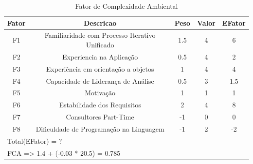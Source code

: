 \begin{table}[!htb]
\caption[FCA]{Fator de Complexidade Ambiental}
	\label{tab:correlacao}
	\centering
	\begin{tabular}{c|c|c|c|c}
		Fator & Descricao										                    & Peso	& Valor & EFator   \\   \hline
		F1	  & Familiaridade com Processo Iterativo Unificado	& 1.5	  &	 4    &		6		\\
		F2	  & Experiencia na Aplicação						            & 0.5	  &	 4    &		2 	 	\\
		F3 	  & Experiência em orientação a objetos				      & 1		  &  4    &		4 		\\
		F4 	  & Capacidade de Liderança de Análise				      & 0.5	  &	 3    &		1.5 		\\
		F5 	  & Motivação										                    & 1		  &	 1    &		1 		\\
		F6 	  & Estabilidade dos Requisitos						          & 2		  &  4    &		8 		\\
		F7 	  & Consultores Part-Time							              & -1	  &	 0    &		0 		\\
		F8 	  & Dificuldade de Programação na Linguagem			    & -1	  &	 2    &		-2 		\\ \hline
		\multicolumn{5}{l}{Total(EFator) = ?}\\ \hline
		\multicolumn{5}{l}{FCA => 1.4 + (-0.03 * 20.5) = 0.785}\\
	\end{tabular}
\end{table}


